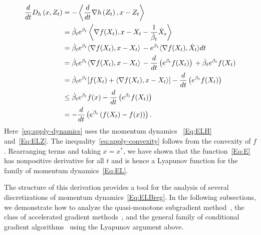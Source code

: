 \documentclass[11pt]{article}
\theoremstyle{plain}
\begin{document}
\begin{subequations}\label{Eq:LyapAnal}
\begin{align}
 \frac{d}{dt}D_h\left(x, Z_t\right)  %
 &= -\left\langle \frac{d}{dt} \nabla h\left(Z_t\right), x - Z_t\right\rangle \, \notag\\%
&=   \dot \beta_t e^{\beta_t}\left\langle\nabla f(X_t), x  - X_{t} - \frac{1}{\dot \beta_t} \dot X_{s} \right\rangle  \, \label{eq:apply-dynamics}   \\
& =   \dot \beta_t e^{\beta_t} \langle \nabla f(X_t), x - X_t \rangle\, - e^{ \beta_t} \langle \nabla f(X_t), \dot X_t\rangle dt\, \notag   \\
& = \dot \beta_t e^{\beta_t} \langle \nabla f(X_t), x - X_t \rangle\,  -   \frac{d}{dt}\left(e^{ \beta_t} f(X_t)\right)\,   + \dot \beta_t e^{\beta_t}  f(X_t)  \notag\\
&= \dot \beta_t e^{\beta_t} [f(X_t)+ \langle \nabla f(X_t), x - X_t \rangle] -\frac{d}{dt}\left(e^{ \beta_t} f(X_t)\right)\,  \notag  \\ %
& \leq  \dot \beta_t e^{\beta_t}f(x) - \frac{d}{dt}\left(e^{ \beta_t} f(X_t)\right)\, \label{eq:apply-convexity}\\
& = - \frac{d}{dt} \left(e^{\beta_t}\left(f(X_t) - f(x)\right)\right) \label{Eq:cond1}.
\end{align}
\end{subequations}
Here~\eqref{eq:apply-dynamics} uses the momentum dynamics%
~\eqref{Eq:ELH} and~\eqref{Eq:ELZ}. 
The inequality~\eqref{eq:apply-convexity} follows from the convexity of $f$. Rearranging terms and taking $x = x^\ast$, we have shown that the function~\eqref{Eq:E} has nonpositive derivative for all $t$ and is hence a Lyapunov function for the family of momentum dynamics~\eqref{Eq:EL}.

 The structure of this derivation provides a tool for the analysis of several discretizations of momentum dynamics~\eqref{Eq:ELBreg}.
 In the following subsections, we demonstrate how to analyze the quasi-monotone subgradient method~\cite{Nesterov15}, the class of accelerated gradient methods~\cite{Baes09,Acceleration}, and the general family of conditional gradient algorithms~\cite{NesterovCond15} using the Lyapunov argument above.
\end{document}
